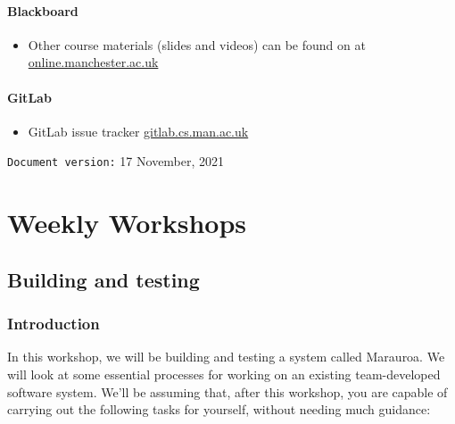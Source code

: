 \documentclass[
]{book}
\providecommand{\tightlist}{%
  \setlength{\itemsep}{0pt}\setlength{\parskip}{0pt}}
\begin{document}
\hypertarget{blackboard}{%
\subsection{Blackboard}\label{blackboard}}

\begin{itemize}
\tightlist
\item
  Other course materials (slides and videos) can be found on at \href{https://online.manchester.ac.uk/}{online.manchester.ac.uk}
\end{itemize}

\hypertarget{gitlab}{%
\subsection{GitLab}\label{gitlab}}

\begin{itemize}
\tightlist
\item
  GitLab issue tracker \href{https://gitlab.cs.man.ac.uk/}{gitlab.cs.man.ac.uk}
\end{itemize}

























\texttt{Document\ version:} 17 November, 2021

\hypertarget{part-weekly-workshops}{%
\part{Weekly Workshops}\label{part-weekly-workshops}}

\hypertarget{building}{%
\chapter{Building and testing}\label{building}}

\hypertarget{Introduction}{%
\section{Introduction}\label{Introduction}}

In this workshop, we will be building and testing a system called Marauroa. We will look at some essential processes for working on an existing team-developed software system. We'll be assuming that, after this workshop, you are capable of carrying out the following tasks for yourself, without needing much guidance:
\end{document}
